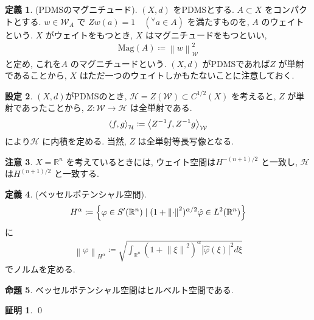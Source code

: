 \documentclass[10pt, fleqn, label-section=none]{bxjsarticle}
\theoremstyle{definition}
\newtheorem{dfn}{定義}[section]
\newtheorem{prop}[dfn]{命題}
\newtheorem{setting}[dfn]{設定}
\newtheorem*{pf*}{証明}
\newtheorem{remark}[dfn]{注意}
\newcommand{\any}{{}^{\forall}}
\newcommand{\cbra}[1]{\mleft\{#1\mright\}}
\newcommand{\tbra}[1]{\mleft\langle#1\mright\rangle}
\newcommand{\abs}[1]{\left|#1\right|}
\newcommand{\norm}[1]{\left\|#1\right\|}
\renewcommand{\;}{\, ; \,}
\newcommand{\Mag}{\textrm{Mag}}
\begin{document}
\begin{dfn}(PDMSのマグニチュード). $(X, d)$ をPDMSとする. $A \subset X$ をコンパクトとする. $w \in \mathcal W_A$ で
$Zw(a) = 1 \quad (\any a \in A)$ を満たすものを, $A$ のウェイトという. $X$ がウェイトをもつとき, $X$ はマグニチュードをもつといい, 
\begin{align*} \Mag(A) \coloneqq \norm{w} _{\mathcal W} ^2\end{align*}
と定め, これを$A$ のマグニチュードという. $(X, d)$ がPDMSであれば$Z$ が単射であることから, $X$ はただ一つのウェイトしかもたないことに注意しておく. 
\end{dfn}




\begin{setting}$(X, d)$がPDMSのとき, $\mathcal H = Z(\mathcal W) \subset C^{1/2}(X)$ を考えると, $Z$ が単射であったことから, $Z: \mathcal W \rightarrow \mathcal H$ は全単射である. 
\begin{align*} \tbra{f, g}_{\mathcal H} \coloneqq \tbra{Z^{-1}f, Z^{-1}g}_{\mathcal W} \end{align*}
により$\mathcal H$ に内積を定める. 当然, $Z$ は全単射等長写像となる. 
\end{setting}

\begin{remark}
$X = \mathbb R^n$ を考えているときには, ウェイト空間は$H^{-(n+1)/2}$ と一致し, $\mathcal H$ は$H^{(n+1)/2}$ と一致する. 
\end{remark}





\begin{dfn}(ベッセルポテンシャル空間). 
\begin{align*} H^\alpha \coloneqq \cbra{ \varphi \in S^\prime (\mathbb R^n) \mid (1 + \norm{\cdot} ^2) ^{\alpha/2} \hat \varphi \in L^2(\mathbb R^n)}  \end{align*}
に
\begin{align*} \norm{\varphi }_{H^\alpha} \coloneqq \sqrt{ \int_{\mathbb R^n} (1 + \norm \xi ^2) ^\alpha \abs{\hat \varphi(\xi)} ^2 d\xi }  \end{align*}
でノルムを定める. 
\end{dfn}

\begin{prop}ベッセルポテンシャル空間はヒルベルト空間である. 

\end{prop}
\begin{pf*}

\qed
\end{pf*}
\end{document}
